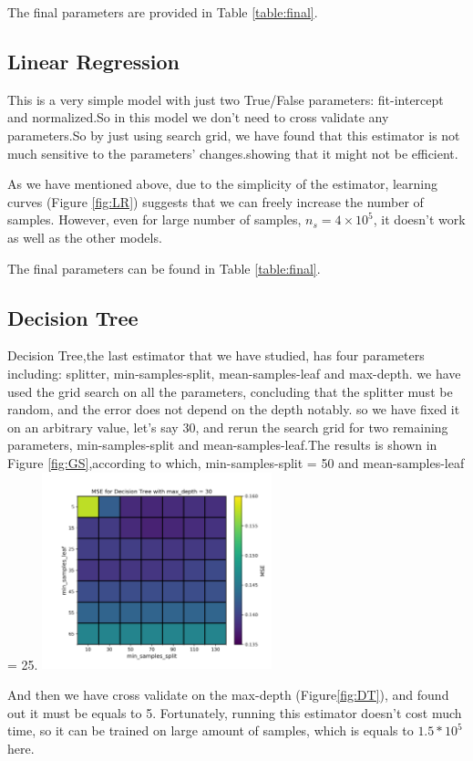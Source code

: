 \documentclass[a4paper,12pt]{article}
\begin{document}
\begin{multicols}{2}
The final parameters are provided in Table \ref{table:final}.
\subsection{Linear Regression}
This is a very simple model with just two True/False parameters: fit-intercept and normalized.So in this model we don't need to cross validate any parameters.So by just using search grid, we have found that this estimator is not much sensitive to the parameters' changes.showing that it might not be efficient.

As we have mentioned above, due to the simplicity of the estimator, learning curves (Figure \ref{fig:LR}) suggests that we can freely increase the number of samples. However, even for large number of samples, $n_s = 4\times10^5$, it doesn't work as well as the other models.

The final parameters can be found in Table \ref{table:final}.
\subsection{Decision Tree}
\label{section:fifth_method}
Decision Tree,the last estimator that we have studied, has four parameters including: splitter, min-samples-split, mean-samples-leaf and max-depth. we have used the grid search on all the parameters, concluding that the splitter must be random, and the error does not depend on the depth notably. so we have fixed it on an arbitrary value, let's say 30, and rerun the search grid for two remaining parameters, min-samples-split and mean-samples-leaf.The results is shown in Figure \ref{fig:GS},according to which, min-samples-split = 50 and mean-samples-leaf = 25.
\includegraphics[width=0.5\textwidth]{gridsearch_5.png}
\label{fig:GS}

And then we have cross validate on the max-depth (Figure\ref{fig:DT}), and found out it must be equals to 5.
Fortunately, running this estimator doesn't cost much time, so it can be trained on large amount of samples, which is equals to $1.5*10^5$ here.


\end{multicols}
\end{document}
